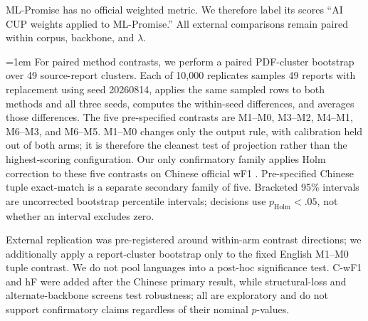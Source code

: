 ML-Promise has no official weighted metric. We therefore label its scores
``AI CUP weights applied to ML-Promise.'' All external
comparisons remain paired within corpus, backbone, and $\lambda$.

\begingroup\emergencystretch=1em
For paired method contrasts, we perform a paired PDF-cluster bootstrap over 49
source-report clusters. Each of 10,000 replicates samples 49 reports with
replacement using seed 20260814, applies the same sampled rows to both methods
and all three seeds, computes the within-seed differences, and averages those
differences. The five pre-specified contrasts are M1--M0, M3--M2, M4--M1,
M6--M3, and M6--M5. M1--M0 changes only the output rule, with calibration held
out of both arms; it is therefore the cleanest test of projection rather than
the highest-scoring configuration. Our only confirmatory family applies Holm correction to
these five contrasts on Chinese official wF1 \cite{holm1979}. Pre-specified
Chinese tuple exact-match is a separate secondary family of five. Bracketed
95\% intervals are uncorrected bootstrap percentile intervals; decisions use
$p_{\mathrm{Holm}}<.05$, not whether an interval excludes zero.
\par\endgroup

External replication was pre-registered around within-arm contrast directions;
we additionally apply a report-cluster bootstrap only to the fixed English
M1--M0 tuple contrast. We do not pool languages into a post-hoc significance
test. C-wF1 and hF were added after the Chinese primary result, while
structural-loss and alternate-backbone screens test robustness; all are
exploratory and do not support confirmatory claims regardless of their nominal
$p$-values.
